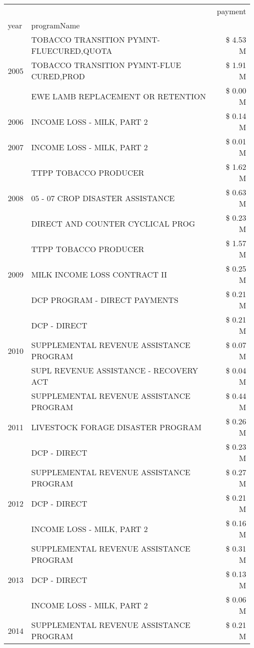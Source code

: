\begin{tabular}{llr}
\toprule
 &  & payment \\
year & programName &  \\
\midrule
\multirow[t]{3}{*}{2005} & TOBACCO TRANSITION PYMNT-FLUECURED,QUOTA & \$ 4.53 M \\
 & TOBACCO TRANSITION PYMNT-FLUE CURED,PROD & \$ 1.91 M \\
 & EWE LAMB REPLACEMENT OR RETENTION & \$ 0.00 M \\
\cline{1-3}
2006 & INCOME LOSS - MILK, PART 2 & \$ 0.14 M \\
\cline{1-3}
2007 & INCOME LOSS - MILK, PART 2 & \$ 0.01 M \\
\cline{1-3}
\multirow[t]{3}{*}{2008} & TTPP TOBACCO PRODUCER & \$ 1.62 M \\
 & 05 - 07 CROP DISASTER ASSISTANCE & \$ 0.63 M \\
 & DIRECT AND COUNTER CYCLICAL PROG & \$ 0.23 M \\
\cline{1-3}
\multirow[t]{3}{*}{2009} & TTPP TOBACCO PRODUCER & \$ 1.57 M \\
 & MILK INCOME LOSS CONTRACT II & \$ 0.25 M \\
 & DCP PROGRAM - DIRECT PAYMENTS & \$ 0.21 M \\
\cline{1-3}
\multirow[t]{3}{*}{2010} & DCP - DIRECT & \$ 0.21 M \\
 & SUPPLEMENTAL REVENUE ASSISTANCE PROGRAM & \$ 0.07 M \\
 & SUPL REVENUE ASSISTANCE - RECOVERY ACT & \$ 0.04 M \\
\cline{1-3}
\multirow[t]{3}{*}{2011} & SUPPLEMENTAL REVENUE ASSISTANCE PROGRAM & \$ 0.44 M \\
 & LIVESTOCK FORAGE DISASTER PROGRAM & \$ 0.26 M \\
 & DCP - DIRECT & \$ 0.23 M \\
\cline{1-3}
\multirow[t]{3}{*}{2012} & SUPPLEMENTAL REVENUE ASSISTANCE PROGRAM & \$ 0.27 M \\
 & DCP - DIRECT & \$ 0.21 M \\
 & INCOME LOSS - MILK, PART 2 & \$ 0.16 M \\
\cline{1-3}
\multirow[t]{3}{*}{2013} & SUPPLEMENTAL REVENUE ASSISTANCE PROGRAM & \$ 0.31 M \\
 & DCP - DIRECT & \$ 0.13 M \\
 & INCOME LOSS - MILK, PART 2 & \$ 0.06 M \\
\cline{1-3}
\multirow[t]{3}{*}{2014} & SUPPLEMENTAL REVENUE ASSISTANCE PROGRAM & \$ 0.21 M \\

\end{tabular}

